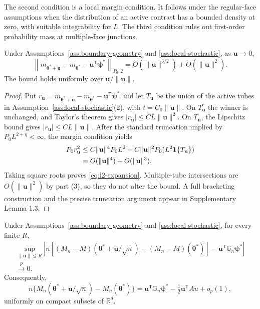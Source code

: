 The second condition is a local margin condition.  It follows under the
regular-face assumptions when the distribution of an active contrast has a
bounded density at zero, with suitable integrability for $L$.  The third
condition rules out first-order probability mass at multiple-face junctions.

\begin{lemma}
\label{lem:l2-expansion}
Under Assumptions~\ref{ass:boundary-geometry} and
\ref{ass:local-stochastic}, as $\mathbf{u}\to0$,
\begin{equation}
 \left\|m_{\boldsymbol{\theta}^*+\mathbf{u}}-m_{\boldsymbol{\theta}^*}-\mathbf{u}^\mathsf T\boldsymbol{\psi}^*\right\|_{P_0,2}
 =O(\|\mathbf{u}\|^{3/2})+O(\|\mathbf{u}\|^2).
 \label{eq:l2-expansion}
\end{equation}
The bound holds uniformly over $\mathbf{u}/\|\mathbf{u}\|$.
\end{lemma}

\begin{proof}
Put $r_{\mathbf u}=m_{\boldsymbol\theta^*+\mathbf u}-
m_{\boldsymbol\theta^*}-\mathbf u^\mathsf T\boldsymbol\psi^*$ and let
$T_{\mathbf u}$ be the union of the active tubes in
Assumption~\ref{ass:local-stochastic}(2), with $t=C_0\|\mathbf u\|$.
On $T_{\mathbf u}^c$ the winner is unchanged, and Taylor's theorem gives
$|r_{\mathbf u}|\leq C L\|\mathbf u\|^2$. On $T_{\mathbf u}$, the Lipschitz
bound gives $|r_{\mathbf u}|\leq C L\|\mathbf u\|$. After the standard
truncation implied by $P_0L^{2+\eta}<\infty$, the margin condition yields
\begin{align*}
 P_0r_{\mathbf u}^2
 &\leq C\|\mathbf u\|^4P_0L^2
   +C\|\mathbf u\|^2P_0(L^2\mathbf 1\{T_{\mathbf u}\})\\
 &=O(\|\mathbf u\|^4)+O(\|\mathbf u\|^3).
\end{align*}
Taking square roots proves \eqref{eq:l2-expansion}. Multiple-tube intersections
are $O(\|\mathbf u\|^2)$ by part (3), so they do not alter the bound. A full
bracketing construction and the precise truncation argument appear in
Supplementary Lemma 1.3.
\end{proof}

\begin{theorem}
\label{thm:local-empirical-expansion}
Under Assumptions~\ref{ass:boundary-geometry} and
\ref{ass:local-stochastic}, for every finite $R$,
\begin{multline}
 \sup_{\|\mathbf{u}\|\leq R}\left|
 n\left[(M_n-M)(\boldsymbol{\theta}^*+\mathbf{u}/\sqrt n)
       -(M_n-M)(\boldsymbol{\theta}^*)\right]
 -\mathbf{u}^\mathsf T\mathbb G_n\boldsymbol{\psi}^*
 \right|\\
 \xrightarrow{p}0.
 \label{eq:local-empirical-expansion}
\end{multline}
Consequently,
\begin{equation}
 n\{M_n(\boldsymbol{\theta}^*+\mathbf{u}/\sqrt n)-M_n(\boldsymbol{\theta}^*)\}
 =\mathbf{u}^\mathsf T\mathbb G_n\boldsymbol{\psi}^*
  -\tfrac12\mathbf{u}^\mathsf TAu+o_p(1),
 \label{eq:local-asymptotic-quadratic}
\end{equation}
uniformly on compact subsets of $\mathbb R^d$.
\end{theorem}

